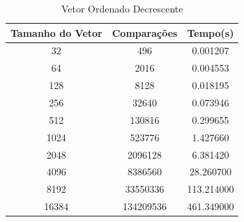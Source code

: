 \documentclass[12pt,a4paper,twoside]{report}
\begin{document}
\begin{table}[h]
  \centering
  \caption{Vetor Ordenado Decrescente \label{tab:od}}
  \begin{tabular}{ccc} \\\hline
  \textbf{Tamanho do Vetor} & \textbf{Comparações} & \textbf{Tempo(s)} \\\hline
  32                        & 496                  & 0.001207          \\\hline
  64                        & 2016                 & 0.004553          \\\hline
  128                       & 8128                 & 0.018195          \\\hline
  256                       & 32640                & 0.073946          \\\hline
  512                       & 130816               & 0.299655          \\\hline
  1024                      & 523776               & 1.427660          \\\hline
  2048                      & 2096128              & 6.381420          \\\hline
  4096                      & 8386560              & 28.260700         \\\hline
  8192                      & 33550336             & 113.214000        \\\hline
  16384                     & 134209536            & 461.349000        \\\hline
  \end{tabular}
\end{table}
\end{document}

